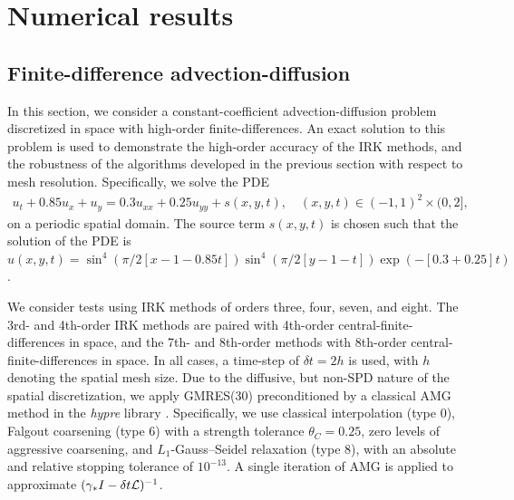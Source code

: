 \documentclass[review]{siamart}
\begin{document}
\section{Numerical results}\label{sec:numerics}

\subsection{Finite-difference advection-diffusion}\label{sec:numerics:fd}

In this section, we consider a constant-coefficient advection-diffusion problem
discretized in space with high-order finite-differences. An exact solution to
this problem is used to demonstrate the high-order accuracy of the IRK methods,
and the robustness of the algorithms developed in the previous section with
respect to mesh resolution. Specifically, we solve the PDE
%
\begin{align}
\label{eq:FD_ex} u_t + 0.85 u_x + u_y = 0.3 u_{xx} + 0.25 u_{yy} + s(x,y,t),
\quad (x,y,t) \in (-1,1)^2 \times (0,2],
\end{align}
%
on a periodic spatial domain. The source term $s(x,y,t)$ is chosen such that
the solution of the PDE is
$u(x,y,t)=\sin^4(\pi/2[x-1-0.85t]) \sin^4(\pi/2 [y-1-t]) \exp(-[0.3+0.25]t)$.

We consider tests using IRK methods of orders three, four, seven, and eight. The
3rd- and 4th-order IRK methods are paired with 4th-order
central-finite-differences in space, and the 7th- and 8th-order methods with
8th-order central-finite-differences in space. In all cases, a time-step of
$\delta t = 2 h$ is used, with $h$ denoting the spatial mesh size. Due to the
diffusive, but non-SPD nature of the spatial discretization, we apply GMRES(30)
preconditioned by a classical AMG method in the \textit{hypre} library
\cite{Falgout:2002vu}. Specifically, we
use classical interpolation (type 0), Falgout coarsening (type 6) with a strength
tolerance $\theta_C = 0.25$, zero levels of aggressive coarsening, and
$L_1$-Gauss--Seidel relaxation (type 8), with an absolute and relative stopping
tolerance of $10^{-13}$. A single iteration of AMG is applied to approximate
$(\gamma_* I - \delta t {\cal L})^{-1}$.
\end{document}
